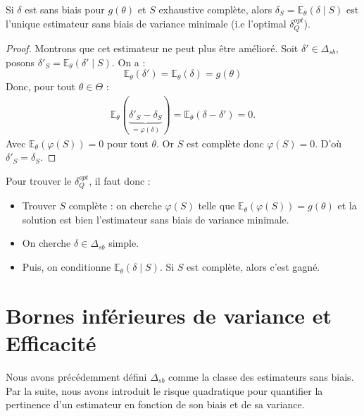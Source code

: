 \begin{theorem}
    Si $ \delta$ est sans biais pour $ g( \theta)$ et $S$ exhaustive complète, alors 
    $ \delta_S = \mathbb{E}_\theta( \delta \mid S)$ est l'unique estimateur sans biais 
    de variance minimale (i.e l'optimal $ \delta_Q^{opt}$).
\end{theorem}

\begin{proof}
    Montrons que cet estimateur ne peut plus être amélioré. Soit $ \delta' \in \Delta_{sb}$, 
    posons $ \delta'_S = \mathbb{E}_\theta( \delta' \mid S)$. On a : 
        $$ \mathbb{E}_\theta( \delta') = \mathbb{E}_\theta( \delta) = g( \theta) $$
    Donc, pour tout $ \theta \in \Theta$ : 
        \begin{align*}
            \mathbb{E}_\theta( \underbrace{\delta'_S - \delta_S}_{= \varphi( \delta)}) = \mathbb{E}_\theta( \delta - \delta') = 0. 
        \end{align*}
    Avec $ \mathbb{E}_\theta( \varphi( S)) = 0$ pour tout $ \theta$. Or $S$ est complète donc 
    $ \varphi(S) = 0 $. D'où $ \delta'_S = \delta_S$. 
\end{proof}

\begin{proposition}
    Pour trouver le $ \delta_Q^{opt}$, il faut donc : 
    \begin{itemize}
        \item Trouver $S$ complète : on cherche $ \varphi (S)$ telle que $ \mathbb{E}_\theta( \varphi(S)) = g( \theta)$
            et la solution est bien l'estimateur sans biais de variance minimale. 
        \item On cherche $ \delta \in \Delta_{sb}$ simple. 
        \item Puis, on conditionne $ \mathbb{E}_\theta( \delta \mid S)$. Si $S$ 
            est complète, alors c'est gagné. 
    \end{itemize}
\end{proposition}



\section{Bornes inférieures de variance et Efficacité}

Nous avons précédemment défini $\Delta_{sb}$ comme la classe des estimateurs sans biais. 
Par la suite, nous avons introduit le risque quadratique pour quantifier la pertinence d'un estimateur en 
fonction de son biais et de sa variance. 

